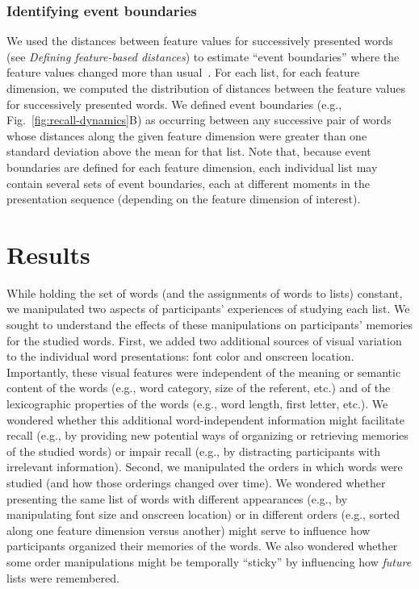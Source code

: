 \documentclass[11pt]{article}
\begin{document}
\subsubsection*{Identifying event boundaries}

We used the distances between feature values for successively presented words
(see \textit{Defining feature-based distances}) to estimate ``event
boundaries'' where the feature values changed more than
usual~\citep{EzzyDava11, MannEtal16,RadvCope06, SwalEtal09, SwalEtal11,
DuBrDava16}. For each list, for each feature dimension, we computed the
distribution of distances between the feature values for successively presented
words. We defined event boundaries (e.g., Fig.~\ref{fig:recall-dynamics}B) as
occurring between any successive pair of words whose distances along the given
feature dimension were greater than one standard deviation above the mean for
that list. Note that, because event boundaries are defined for each feature
dimension, each individual list may contain several sets of event boundaries,
each at different moments in the presentation sequence (depending on the
feature dimension of interest).

\section*{Results}

While holding the set of words (and the assignments of words to lists)
constant, we manipulated two aspects of participants' experiences of studying
each list. We sought to understand the effects of these manipulations on
participants' memories for the studied words. First, we added two additional
sources of visual variation to the individual word presentations: font color
and onscreen location. Importantly, these visual features were independent of
the meaning or semantic content of the words (e.g., word category, size of the
referent, etc.) and of the lexicographic properties of the words (e.g., word length,
first letter, etc.). We wondered whether this additional word-independent information
might facilitate recall (e.g., by providing new potential ways of organizing or
retrieving memories of the studied words) or impair recall (e.g., by
distracting participants with irrelevant information). Second, we manipulated
the orders in which words were studied (and how those orderings changed over
time). We wondered whether presenting the same list of words with different
appearances (e.g., by manipulating font size and onscreen location) or in
different orders (e.g., sorted along one feature dimension versus another)
might serve to influence how participants organized their memories of the
words. We also wondered whether some order manipulations might be temporally
``sticky'' by influencing how \textit{future} lists were remembered.
\end{document}
